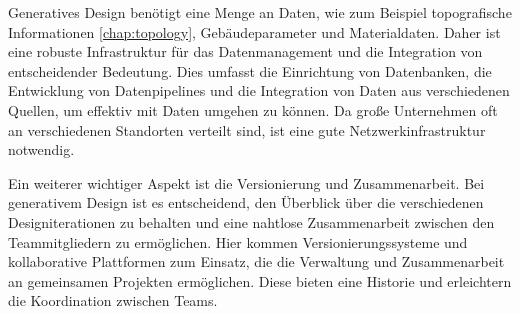 Generatives Design benötigt eine Menge an Daten, wie zum Beispiel topografische Informationen \autoref{chap:topology}, Gebäudeparameter und Materialdaten. Daher ist eine robuste Infrastruktur für das Datenmanagement und die Integration von entscheidender Bedeutung. Dies umfasst die Einrichtung von Datenbanken, die Entwicklung von Datenpipelines und die Integration von Daten aus verschiedenen Quellen, um effektiv mit Daten umgehen zu können. Da große Unternehmen oft an verschiedenen Standorten verteilt sind, ist eine gute Netzwerkinfrastruktur notwendig. 

Ein weiterer wichtiger Aspekt ist die Versionierung und Zusammenarbeit. Bei generativem Design ist es entscheidend, den Überblick über die verschiedenen Designiterationen zu behalten und eine nahtlose Zusammenarbeit zwischen den Teammitgliedern zu ermöglichen. Hier kommen Versionierungssysteme und kollaborative Plattformen zum Einsatz, die die Verwaltung und Zusammenarbeit an gemeinsamen Projekten ermöglichen. Diese bieten eine Historie und erleichtern die Koordination zwischen Teams.

